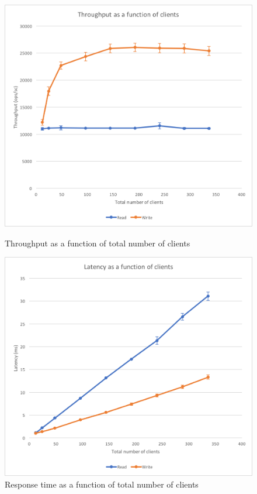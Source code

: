 \documentclass[11pt,a4paper]{article}
\begin{document}
\begin{figure}[!h]
    \centering
    \begin{minipage}[b]{.45\textwidth}
        \centering
        \includegraphics[width=\textwidth]{processing/graphics/bench_memcached_through-clients.png}
        \caption{Throughput as a function of total number of clients}
        \label{png::bench_memcached_through-clients}
    \end{minipage}
    \qquad
    \begin{minipage}[b]{.45\textwidth}
        \centering
        \includegraphics[width=\textwidth]{processing/graphics/bench_memcached_latency-clients.png}
        \caption{Response time as a function of total number of clients}
        \label{png::bench_memcached_latency-clients}
    \end{minipage}
\end{figure}
\end{document}
